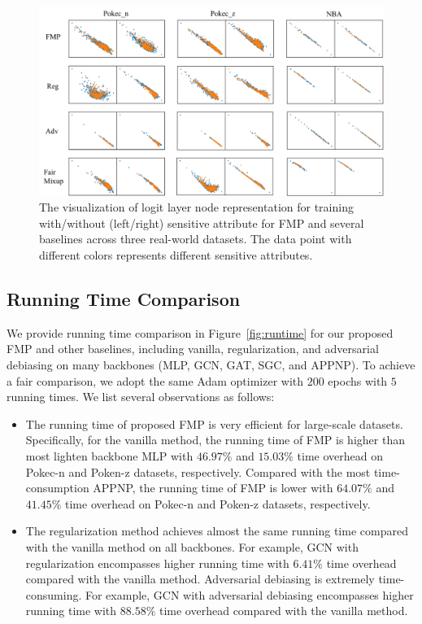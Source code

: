 \documentclass[letterpaper]{article} %
\theoremstyle{plain}
\theoremstyle{definition}
\theoremstyle{remark}
\begin{document}
\begin{figure}[t]
\centering
\includegraphics[width=0.99\linewidth]{inf_visual.pdf}

\caption{The visualization of logit layer node representation for training with/without (left/right) sensitive attribute for FMP and several baselines across three real-world datasets. The data point with different colors represents different sensitive attributes.}
\label{fig:infprobe}
\vspace{-5pt}
\end{figure}

\subsection{Running Time Comparison} \label{app:runningtime}
We provide running time comparison in Figure~\ref{fig:runtime} for our proposed FMP and other baselines, including vanilla, regularization, and adversarial debiasing on many backbones (MLP, GCN, GAT, SGC, and APPNP). To achieve a fair comparison, we adopt the same Adam optimizer with $200$ epochs with $5$ running times. 
We list several observations as follows:
\begin{itemize}[leftmargin=0.2cm, itemindent=.0cm, itemsep=0.0cm, topsep=0.0cm]
    \item The running time of proposed FMP is very efficient for large-scale datasets. Specifically, for the vanilla method, the running time of FMP is higher than most lighten backbone MLP with $46.97\%$ and $15.03\%$ time overhead on Pokec-n and Poken-z datasets, respectively. Compared with the most time-consumption APPNP, the running time of FMP is lower with $64.07\%$ and $41.45\%$ time overhead on Pokec-n and Poken-z datasets, respectively.
    \item The regularization method achieves almost the same running time compared with the vanilla method on all backbones. For example, GCN with regularization encompasses higher running time with $6.41\%$ time overhead compared with the vanilla method. Adversarial debiasing is extremely time-consuming. For example, GCN with adversarial debiasing encompasses higher running time with $88.58\%$ time overhead compared with the vanilla method.
\end{itemize}
\end{document}
